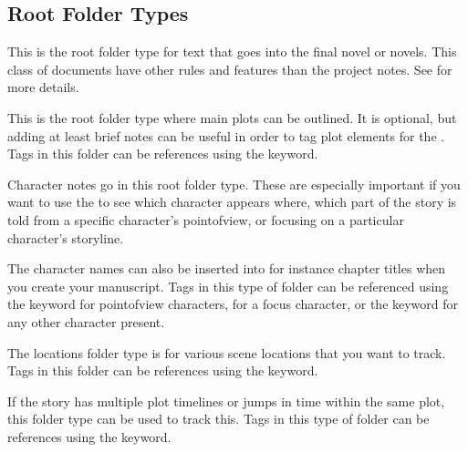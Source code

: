 \documentclass[a4paper,11pt,english]{sphinxmanual}
\begin{document}
\subsection{Root Folder Types}
\label{\detokenize{project_overview:root-folder-types}}\begin{description}
\sphinxAtStartPar
This is the root folder type for text that goes into the final novel or novels. This class of
documents have other rules and features than the project notes. See {\hyperref[\detokenize{project_structure:a-struct}]{}} for more
details.

\sphinxAtStartPar
This is the root folder type where main plots can be outlined. It is optional, but adding at
least brief notes can be useful in order to tag plot elements for the . Tags in
this folder can be references using the  keyword.

\sphinxAtStartPar
Character notes go in this root folder type. These are especially important if you want to use
the  to see which character appears where, which part of the story is told from
a specific character’s point\sphinxhyphen{}of\sphinxhyphen{}view, or focusing on a particular character’s storyline.

\sphinxAtStartPar
The character names can also be inserted into for instance chapter titles when you create your
manuscript. Tags in this type of folder can be referenced using the  keyword for
point\sphinxhyphen{}of\sphinxhyphen{}view characters,  for a focus character, or the  keyword for any
other character present.

\sphinxAtStartPar
The locations folder type is for various scene locations that you want to track. Tags in this
folder can be references using the  keyword.

\sphinxAtStartPar
If the story has multiple plot timelines or jumps in time within the same plot, this folder type
can be used to track this. Tags in this type of folder can be references using the 
keyword.


\end{description}
\end{document}
